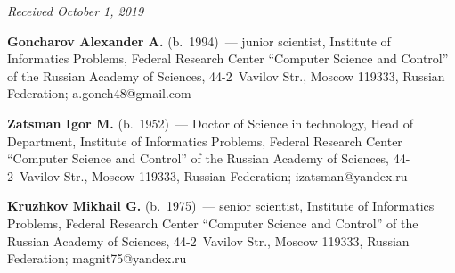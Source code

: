 \vspace*{-7pt}

\hfill{\small\textit{Received October 1, 2019}}


\vspace*{-22pt}
  \Contr
  
  \noindent
  \textbf{Goncharov Alexander A.} (b.\ 1994)~--- junior scientist, Institute of 
Informatics Problems, Federal Research Center ``Computer Science and Control'' 
of the Russian Academy of Sciences, 44-2~Vavilov Str., Moscow 119333, Russian 
Federation; \mbox{a.gonch48@gmail.com}
  
  \vspace*{3pt}
  
  \noindent
  \textbf{Zatsman Igor M.} (b.\ 1952)~--- Doctor of Science in technology, Head 
of Department, Institute of Informatics Problems, Federal Research Center 
``Computer Science and Control'' of the Russian Academy of Sciences,  
44-2~Vavilov Str., Moscow 119333, Russian Federation; 
\mbox{izatsman@yandex.ru}
  
  \vspace*{3pt}
  
  \noindent
  \textbf{Kruzhkov Mikhail G.} (b.\ 1975)~--- senior scientist, Institute of 
Informatics Problems, Federal Research Center ``Computer Science and Control'' 
of the Russian Academy of Sciences, 44-2~Vavilov Str., Moscow 119333, Russian 
Federation; \mbox{magnit75@yandex.ru}

\label{end\stat}

\renewcommand{\bibname}{\protect\rm Литература}  